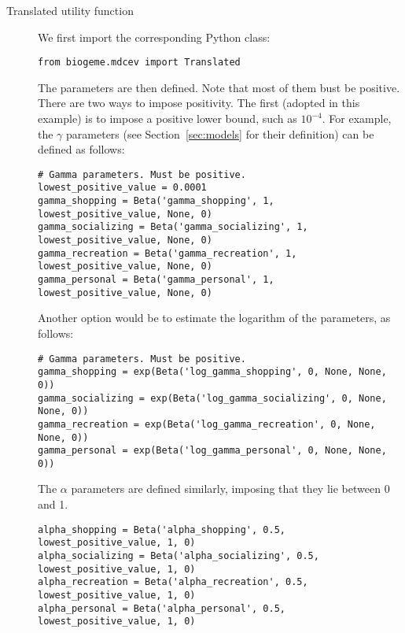 \documentclass[12pt,a4paper]{article}
\begin{document}
\begin{description}
    \item[Translated utility function]  We first import the corresponding Python class:
     \begin{center}
         \begin{lstlisting}
from biogeme.mdcev import Translated
        \end{lstlisting}
     \end{center}
    The  parameters are then defined. Note that most of them bust be positive. There are two ways to impose positivity.
    The first (adopted in this example) is to impose a positive lower bound, such as $10^{-4}$. For example, the $\gamma$
    parameters (see Section~\ref{sec:models} for their definition) can be defined as follows:
    \begin{center}
         \begin{lstlisting}
# Gamma parameters. Must be positive.
lowest_positive_value = 0.0001
gamma_shopping = Beta('gamma_shopping', 1, lowest_positive_value, None, 0)
gamma_socializing = Beta('gamma_socializing', 1, lowest_positive_value, None, 0)
gamma_recreation = Beta('gamma_recreation', 1, lowest_positive_value, None, 0)
gamma_personal = Beta('gamma_personal', 1, lowest_positive_value, None, 0)
         \end{lstlisting}
     \end{center}
    Another option would be to estimate the logarithm of the parameters, as follows:
    \begin{center}
         \begin{lstlisting}
# Gamma parameters. Must be positive.
gamma_shopping = exp(Beta('log_gamma_shopping', 0, None, None, 0))
gamma_socializing = exp(Beta('log_gamma_socializing', 0, None, None, 0))
gamma_recreation = exp(Beta('log_gamma_recreation', 0, None, None, 0))
gamma_personal = exp(Beta('log_gamma_personal', 0, None, None, 0))
         \end{lstlisting}
     \end{center}
The $\alpha$ parameters are defined similarly, imposing that they lie between 0 and 1.
\begin{center}
         \begin{lstlisting}
alpha_shopping = Beta('alpha_shopping', 0.5, lowest_positive_value, 1, 0)
alpha_socializing = Beta('alpha_socializing', 0.5, lowest_positive_value, 1, 0)
alpha_recreation = Beta('alpha_recreation', 0.5, lowest_positive_value, 1, 0)
alpha_personal = Beta('alpha_personal', 0.5, lowest_positive_value, 1, 0)

\end{lstlisting}
\end{center}
\end{description}
\end{document}
